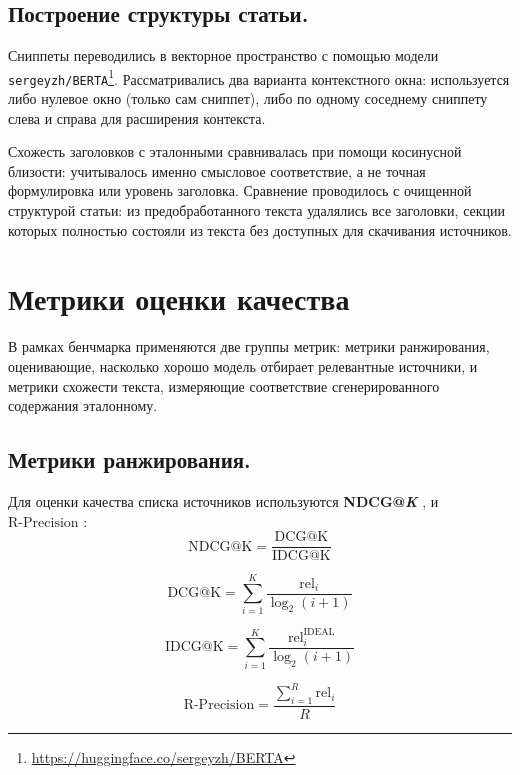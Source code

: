 \documentclass{article}
\begin{document}
\subsection*{Построение структуры статьи.}
Сниппеты переводились в векторное пространство с помощью модели \texttt{sergeyzh/BERTA}\footnote{\url{https://huggingface.co/sergeyzh/BERTA}}. 
Рассматривались два варианта контекстного окна: используется либо нулевое окно (только сам сниппет), либо по одному соседнему сниппету слева и справа для расширения контекста.  

Схожесть заголовков с эталонными сравнивалась при помощи косинусной близости: учитывалось именно смысловое соответствие, а не точная формулировка или уровень заголовка. 
Сравнение проводилось с очищенной структурой статьи: из предобработанного текста удалялись все заголовки, секции которых полностью состояли из текста без доступных для скачивания источников. 

\section*{Метрики оценки качества}

В рамках бенчмарка применяются две группы метрик: метрики ранжирования, оценивающие, насколько хорошо модель отбирает релевантные источники, и метрики схожести текста, измеряющие соответствие сгенерированного содержания эталонному.

\subsection*{Метрики ранжирования.}

Для оценки качества списка источников используются \textbf{NDCG@\textit{K}} \cite{ndcg}, и $\mathrm{R\text{-}Precision}$ \cite{rprecision}:
\begin{equation}\label{ndcg}
\mathrm{NDCG@K}= \frac{\mathrm{DCG@K}}{\mathrm{IDCG@K}}
\end{equation}

\begin{equation}\label{dcg}
\mathrm{DCG@K}= \sum_{i=1}^{K} \frac{\mathrm{rel}_i}{\log_2(i+1)}
\end{equation}

\begin{equation}\label{idcg}
\mathrm{IDCG@K}= \sum_{i=1}^{K} \frac{\mathrm{rel}^{\mathrm{IDEAL}}_i}{\log_2(i+1)}
\end{equation}

\begin{equation}\label{rpr}
\mathrm{R\text{-}Precision}= \frac{\sum_{i=1}^{R} \mathrm{rel}_i}{R}
\end{equation}
\end{document}
